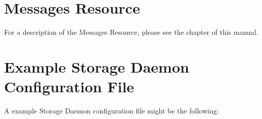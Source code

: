 



\section{Messages Resource}
\label{MessagesResource1}

For a description of the Messages Resource, please see the
 chapter of this
manual.

\section{Example Storage Daemon Configuration File}
\label{ExampleStorageConfiguration}


A example Storage Daemon configuration file might be the following:

